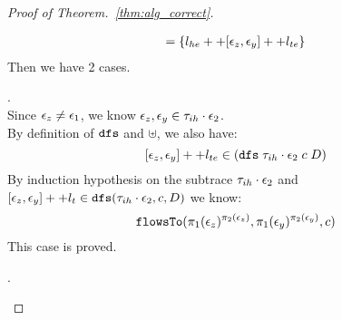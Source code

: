 \begin{proof}[Proof of Theorem.~\ref{thm:alg_correct}]
\begin{case}
\begin{subcase}
\[\begin{array}{l}
  = \{l_{he} ++ [\mathtt{\epsilon}_z, \mathtt{\epsilon}_y] ++ l_{te}\}
\end{array}
\]
Then we have 2 cases.
\begin{subsubcase}.
%
%
\\
Since $\mathtt{\epsilon}_z \neq \mathtt{\epsilon}_1$, we know $\mathtt{\epsilon}_z, \mathtt{\epsilon}_y \in \mathtt{\tau}_{ih} \cdot \mathtt{\epsilon}_2$.
\\
By definition of $\mathtt{dfs}$ and $\uplus$,  we also have:
\[
  [\mathtt{\epsilon}_z, \mathtt{\epsilon}_y] ++ l_{te} \in (\mathtt{dfs} \; {\mathtt{\tau}_{ih} \cdot \mathtt{\epsilon}_2} \; c \; D)
\]
%
%
%
By induction hypothesis on the subtrace $\mathtt{\tau}_{ih} \cdot \mathtt{\epsilon}_2$ and $[\mathtt{\epsilon}_z, \mathtt{\epsilon}_y] ++ l_t 
  \in \mathtt{dfs}(\mathtt{\tau}_{ih} \cdot \mathtt{\epsilon}_2, c, D)$ we know:
\[
  \mathtt{flowsTo}(\pi_1(\mathtt{\epsilon}_z)^{\pi_2(\mathtt{\epsilon}_z)}, \pi_1(\mathtt{\epsilon}_y)^{\pi_2(\mathtt{\epsilon}_y)}, c)
\]
This case is proved.
%
\end{subsubcase}
%
\begin{subsubcase}.
\\

\end{subsubcase}
\end{subcase}
\end{case}
\end{proof}
